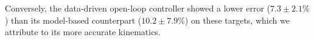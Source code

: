 Conversely, the data-driven open-loop controller showed a lower error ($7.3 \pm 2.1\%$) than its model-based counterpart ($10.2 \pm 7.9\%$) on these targets, which we attribute to its more accurate kinematics.
